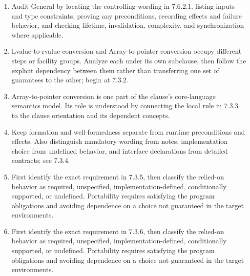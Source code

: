\documentclass[11pt,letterpaper]{article}
\begin{document}
\begin{enumerate}
\item Audit General by locating the controlling wording in 7.6.2.1, listing inputs and type constraints, proving any preconditions, recording effects and failure behavior, and checking lifetime, invalidation, complexity, and synchronization where applicable.
\item Lvalue-to-rvalue conversion and Array-to-pointer conversion occupy different steps or facility groups. Analyze each under its own subclause, then follow the explicit dependency between them rather than transferring one set of guarantees to the other; begin at 7.3.2.
\item Array-to-pointer conversion is one part of the clause's core-language semantics model. Its role is understood by connecting the local rule in 7.3.3 to the clause orientation and its dependent concepts.
\item Keep formation and well-formedness separate from runtime preconditions and effects. Also distinguish mandatory wording from notes, implementation choice from undefined behavior, and interface declarations from detailed contracts; see 7.3.4.
\item First identify the exact requirement in 7.3.5, then classify the relied-on behavior as required, unspecified, implementation-defined, conditionally supported, or undefined. Portability requires satisfying the program obligations and avoiding dependence on a choice not guaranteed in the target environments.
\item First identify the exact requirement in 7.3.6, then classify the relied-on behavior as required, unspecified, implementation-defined, conditionally supported, or undefined. Portability requires satisfying the program obligations and avoiding dependence on a choice not guaranteed in the target environments.
\end{enumerate}
\end{document}
